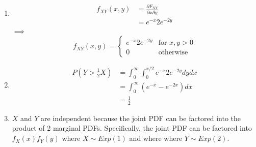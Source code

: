 \begin{problem}{19} $ $
\begin{enumerate}
\item 
\begin{align*}
f_{XY}(x, y) &= \frac{\partial F_{XY}}{\partial x \partial y} \\
& = e^{-x}2e^{-2y}
\end{align*}
$\implies$
\[
  f_{XY}(x, y) =
  \begin{cases}
                                   e^{-x}2e^{-2y}& \text{for $x, y>0$} \\
                                   0& \text{otherwise}
   \end{cases}
\]


\item 
\begin{align*}
P\left(Y>\frac{1}{2}X\right) &= \int_0^\infty \int_0^{x/2}e^{-x}2e^{-2y}dydx \\
& = \int_0^\infty\left(e^{-x}-e^{-2x} \right)dx \\
&=\frac{1}{2}
\end{align*}

\item
$X$ and $Y$ are independent because the joint PDF can be factored into the product of 2 marginal PDFs.  Specifically, the joint PDF can be factored into $f_X(x)f_Y(y)$ where $X\sim Exp(1)$ and where where $Y\sim Exp(2)$.


\end{enumerate}
\end{problem}

